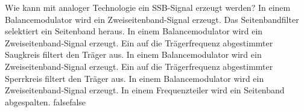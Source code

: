     {Wie kann mit analoger Technologie ein SSB-Signal erzeugt werden?}
    {In einem Balancemodulator wird ein Zweiseitenband-Signal erzeugt. Das Seitenbandfilter selektiert ein Seitenband heraus.}
    {In einem Balancemodulator wird ein Zweiseitenband-Signal erzeugt. Ein auf die Trägerfrequenz abgestimmter Saugkreis filtert den Träger aus.}
    {In einem Balancemodulator wird ein Zweiseitenband-Signal erzeugt. Ein auf die Trägerfrequenz abgestimmter Sperrkreis filtert den Träger aus.}
    {In einem Balancemodulator wird ein Zweiseitenband-Signal erzeugt. In einem Frequenzteiler wird ein Seitenband abgespalten.}
    {false}{false}